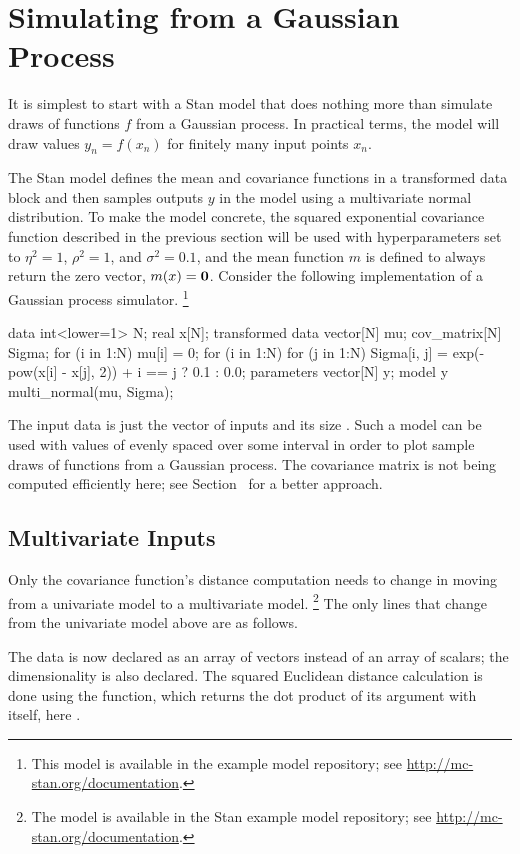 \section{Simulating from a Gaussian Process}

It is simplest to start with a Stan model that does nothing more than
simulate draws of functions $f$ from a Gaussian process.  In practical
terms, the model will draw values $y_n = f(x_n)$ for finitely many
input points $x_n$.

The Stan model defines the mean and covariance functions in a
transformed data block and then samples outputs $y$ in the model using
a multivariate normal distribution.  To make the model concrete, the
squared exponential covariance function described in the previous section
will be used with hyperparameters set to $\eta^2 = 1$, $\rho^2 = 1$,
and $\sigma^2 = 0.1$, and the mean function $m$ is defined to always
return the zero vector, $m(x) = {\bf 0}$.  Consider the following
implementation of a Gaussian process simulator.%
%
\footnote{This model is available in the example model repository;
  see \url{http://mc-stan.org/documentation}.}
%
\begin{stancode}
data {
  int<lower=1> N;
  real x[N];
}
transformed data {
  vector[N] mu;
  cov_matrix[N] Sigma;
  for (i in 1:N) 
    mu[i] = 0;
  for (i in 1:N) 
    for (j in 1:N)
      Sigma[i, j] = exp(-pow(x[i] - x[j], 2)) 
                    + i == j ? 0.1 : 0.0;
}
parameters {
  vector[N] y;
}
model {
  y ~ multi_normal(mu, Sigma);
}
\end{stancode}
%
The input data is just the vector of inputs  and its size
.  Such a model can be used with values of  evenly
spaced over some interval in order to plot sample draws of functions
from a Gaussian process.  The covariance matrix  is not
being computed efficiently here; see
Section~ for a better approach.

\subsection{Multivariate Inputs}

Only the covariance function's distance computation needs to change in
moving from a univariate model to a multivariate model.%
%
\footnote{The model is available in the Stan example model repository;
see \url{http://mc-stan.org/documentation}.}
%
The only lines that change from the univariate model above are as follows.
%
\begin{stancode}
data {
  int<lower=1> D;
  int<lower=1> N;
  vector[D] x[N];
}
transformed data {
...
      Sigma[i, j] = exp(-dot_self(x[i] - x[j]))
                    + i == j ? 0.1 : 0.0;
...
\end{stancode}
%
The data is now declared as an array of vectors instead of an array of
scalars; the dimensionality  is also declared.  The squared
Euclidean distance calculation is done using the 
function, which returns the dot product of its argument with itself, here
.

